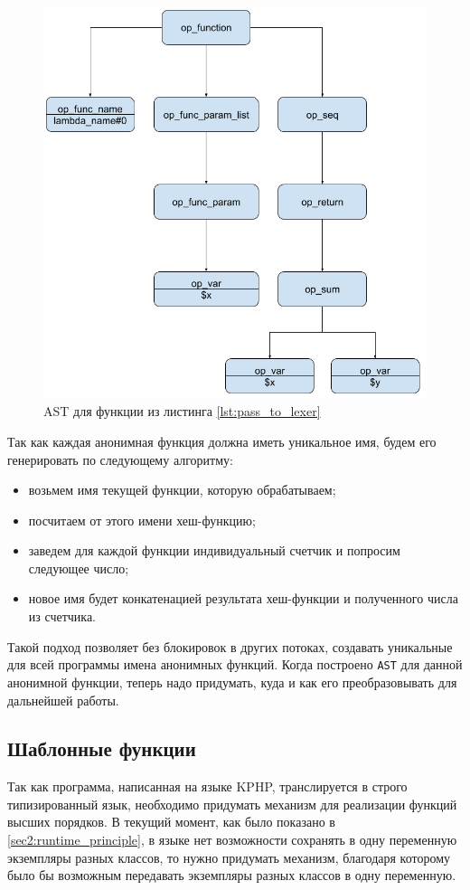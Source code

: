 \begin{figure}[H]
    \caption{AST для функции из листинга \ref{lst:pass_to_lexer}}
    \label{fig:AST_for_sum}
    \centering
    \includegraphics[width=\linewidth]{images/ast_for_id}
\end{figure}

Так как каждая анонимная функция должна иметь уникальное имя, будем его генерировать по следующему алгоритму:
\begin{itemize}
  \item возьмем имя текущей функции, которую обрабатываем;
  \item посчитаем от этого имени хеш-функцию;
  \item заведем для каждой функции индивидуальный счетчик и попросим следующее число;
  \item новое имя будет конкатенацией результата хеш-функции и полученного числа из счетчика.
\end{itemize}

Такой подход позволяет без блокировок в других потоках, создавать уникальные для всей программы имена анонимных функций.
Когда построено \verb|AST| для данной анонимной функции, теперь надо придумать, куда и как его преобразовывать для дальнейшей работы.

\subsection{Шаблонные функции}
\label{sec:template_functions}
Так как программа, написанная на языке KPHP, транслируется в строго типизированный язык, необходимо придумать механизм для реализации функций высших порядков.
В текущий момент, как было показано в \ref{sec2:runtime_principle}, в языке нет возможности сохранять в одну переменную экземпляры разных классов, то нужно придумать механизм, благодаря которому было бы возможным передавать экземпляры разных классов в одну переменную.

